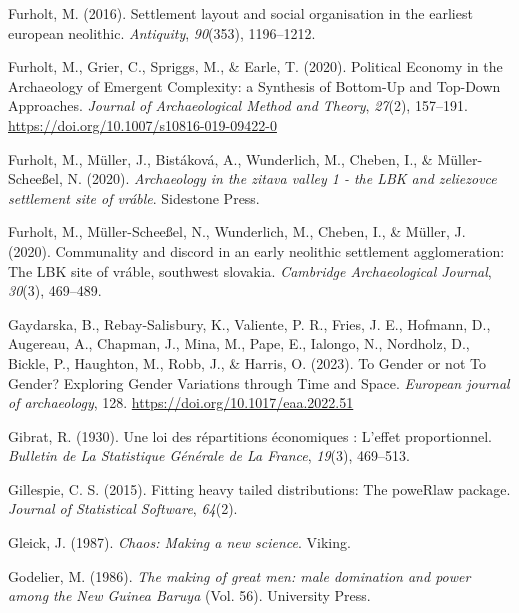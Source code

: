 \documentclass[
  12pt,
]{book}
\newlength{\cslhangindent}
\newlength{\cslentryspacingunit} %
\newenvironment{CSLReferences}[2] %
 {%
  \setlength{\parindent}{0pt}
  \ifodd #1
  \let\oldpar\par
  \def\par{\hangindent=\cslhangindent\oldpar}
  \fi
  \setlength{\parskip}{#2\cslentryspacingunit}
 }%
 {}
\begin{document}
\begin{CSLReferences}{1}{0}
\leavevmode{}%
Furholt, M. (2016). Settlement layout and social organisation in the earliest european neolithic. \emph{Antiquity}, \emph{90}(353), 1196--1212.

\leavevmode{}%
Furholt, M., Grier, C., Spriggs, M., \& Earle, T. (2020). Political Economy in the Archaeology of Emergent Complexity: a Synthesis of Bottom-Up and Top-Down Approaches. \emph{Journal of Archaeological Method and Theory}, \emph{27}(2), 157--191. \url{https://doi.org/10.1007/s10816-019-09422-0}

\leavevmode{}%
Furholt, M., Müller, J., Bistáková, A., Wunderlich, M., Cheben, I., \& Müller-Scheeßel, N. (2020). \emph{Archaeology in the zitava valley 1 - the LBK and zeliezovce settlement site of vráble}. Sidestone Press.

\leavevmode{}%
Furholt, M., Müller-Scheeßel, N., Wunderlich, M., Cheben, I., \& Müller, J. (2020). Communality and discord in an early neolithic settlement agglomeration: The LBK site of vráble, southwest slovakia. \emph{Cambridge Archaeological Journal}, \emph{30}(3), 469--489.

\leavevmode{}%
Gaydarska, B., Rebay-Salisbury, K., Valiente, P. R., Fries, J. E., Hofmann, D., Augereau, A., Chapman, J., Mina, M., Pape, E., Ialongo, N., Nordholz, D., Bickle, P., Haughton, M., Robb, J., \& Harris, O. (2023). To Gender or not To Gender? Exploring Gender Variations through Time and Space. \emph{European journal of archaeology}, 128. \url{https://doi.org/10.1017/eaa.2022.51}

\leavevmode{}%
Gibrat, R. (1930). Une loi des répartitions économiques : L'effet proportionnel. \emph{Bulletin de La Statistique Générale de La France}, \emph{19}(3), 469--513.

\leavevmode{}%
Gillespie, C. S. (2015). Fitting heavy tailed distributions: The poweRlaw package. \emph{Journal of Statistical Software}, \emph{64}(2).

\leavevmode{}%
Gleick, J. (1987). \emph{Chaos: Making a new science}. {Viking}.

\leavevmode{}%
Godelier, M. (1986). \emph{The making of great men: male domination and power among the New Guinea Baruya} (Vol. 56). University Press.


\end{CSLReferences}
\end{document}
